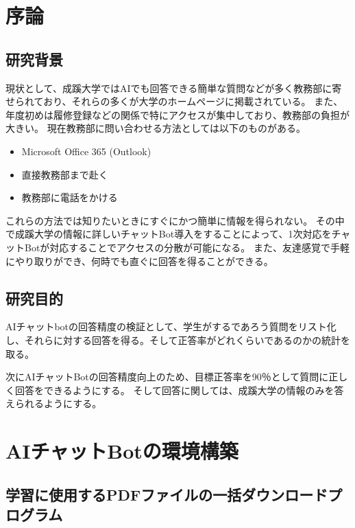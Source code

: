\documentclass[report]{jlreq}
\begin{document}
	\chapter{序論}
		\section{研究背景}
			現状として、成蹊大学ではAIでも回答できる簡単な質問などが多く教務部に寄せられており、それらの多くが大学のホームページに掲載されている。
			また、年度初めは履修登録などの関係で特にアクセスが集中しており、教務部の負担が大きい。
			現在教務部に問い合わせる方法としては以下のものがある。
			\begin{itemize}
				\item Microsoft Office 365 (Outlook)
				\item 直接教務部まで赴く
				\item 教務部に電話をかける
			\end{itemize}
			これらの方法では知りたいときにすぐにかつ簡単に情報を得られない。
			その中で成蹊大学の情報に詳しいチャットBot導入をすることによって、1次対応をチャットBotが対応することでアクセスの分散が可能になる。
			また、友達感覚で手軽にやり取りができ、何時でも直ぐに回答を得ることができる。
		\section{研究目的}
			AIチャットbotの回答精度の検証として、学生がするであろう質問をリスト化し、それらに対する回答を得る。そして正答率がどれくらいであるのかの統計を取る。

			次にAIチャットBotの回答精度向上のため、目標正答率を90％として質問に正しく回答をできるようにする。
			そして回答に関しては、成蹊大学の情報のみを答えられるようにする。
	\chapter{AIチャットBotの環境構築}
		\section{学習に使用するPDFファイルの一括ダウンロードプログラム}
\end{document}
